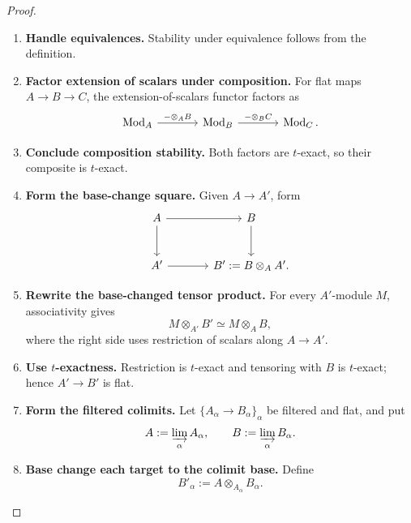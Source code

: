\begin{proof}
\leavevmode
\begin{enumerate}[label=\textup{(\arabic*)}]
    \item \textbf{Handle equivalences.}
    Stability under equivalence follows from the definition.

    \item \textbf{Factor extension of scalars under composition.}
    For flat maps
    \(A\to B\to C\), the extension-of-scalars functor factors as
    \[
    \begin{tikzcd}[column sep=large]
        \Mod_A
            \arrow[r, "-\otimes_A B"]
        &
        \Mod_B
            \arrow[r, "-\otimes_B C"]
        &
        \Mod_C.
    \end{tikzcd}
    \]

    \item \textbf{Conclude composition stability.}
    Both factors are \(t\)-exact, so their composite is \(t\)-exact.

    \item \textbf{Form the base-change square.}
    Given \(A\to A'\), form
    \[
    \begin{tikzcd}[column sep=large, row sep=large]
        A \arrow[r] \arrow[d] & B \arrow[d] \\
        A' \arrow[r] & B':=B\otimes_AA'.
    \end{tikzcd}
    \]

    \item \textbf{Rewrite the base-changed tensor product.}
    For every \(A'\)-module \(M\), associativity gives
    \[
        M\otimes_{A'}B'
        \simeq
        M\otimes_AB,
    \]
    where the right side uses restriction of scalars along \(A\to A'\).

    \item \textbf{Use $t$-exactness.}
    Restriction is \(t\)-exact and tensoring with \(B\) is \(t\)-exact;
    hence \(A'\to B'\) is flat.

    \item \textbf{Form the filtered colimits.}
    Let \(\{A_\alpha\to B_\alpha\}_\alpha\) be filtered and flat, and put
    \[
        A:=\varinjlim_\alpha A_\alpha,
        \qquad
        B:=\varinjlim_\alpha B_\alpha.
    \]

    \item \textbf{Base change each target to the colimit base.}
    Define
    \[
        B'_\alpha
        :=
        A\otimes_{A_\alpha}B_\alpha.
    \]


\end{enumerate}
\end{proof}
